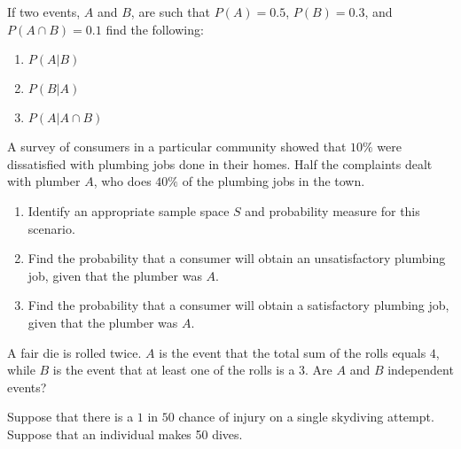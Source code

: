 \documentclass[12pt,reqno]{amsart}
\begin{document}
\prob If two events, $A$ and $B$, are such that $P(A)=0.5$, $P(B)=0.3$, and $P(A\cap B)=0.1$ find the following:

\medskip
\begin{enumerate}
\item $P(A|B)$\vfill
\item $P(B|A)$\vfill
\item $P(A |A\cap B)$\vfill
\end{enumerate}









\newpage
\prob A survey of consumers in a particular community showed that $10\%$ were dissatisfied with plumbing jobs done in their homes. Half the complaints dealt with plumber $A$, who does $40\%$ of the plumbing jobs in the town.

\medskip
\begin{enumerate}
\item Identify an appropriate sample space $S$ and probability measure for this scenario.\vfill
\item Find the probability that a consumer will obtain an unsatisfactory plumbing job, given that the plumber was $A$.\vfill
\item Find the probability that a consumer will obtain a satisfactory plumbing job, given that the plumber was $A$.\vfill
\end{enumerate}














\bigskip
\prob A fair die is rolled twice. $A$ is the event that the total sum of the rolls equals $4$, while $B$ is the event that at least one of the rolls is a 3. Are $A$ and $B$ independent events?\vfill

















\bigskip
\prob Suppose that there is a $1$ in $50$ chance of injury on a single skydiving attempt. Suppose that an individual makes 50 dives.
\end{document}
